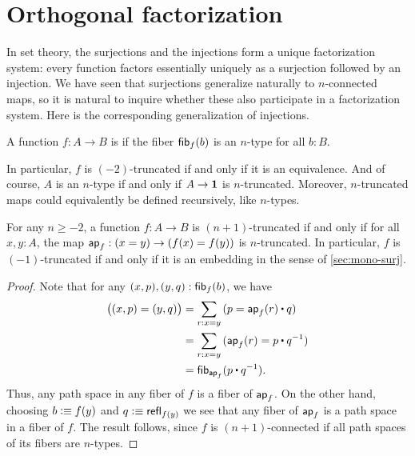 \section{Orthogonal factorization}
\label{sec:image-factorization}

In set theory, the surjections and the injections form a unique factorization system: every function factors essentially uniquely as a surjection followed by an injection.
We have seen that surjections generalize naturally to $n$-connected maps, so it is natural to inquire whether these also participate in a factorization system.
Here is the corresponding generalization of injections.

\begin{defn}
  A function $f:A\to B$ is 
if the fiber ${\mathsf{fib}}_{f}(b)$ is an $n$-type for all $b:B$.
\end{defn}

In particular, $f$ is $(-2)$-truncated if and only if it is an equivalence.
And of course, $A$ is an $n$-type if and only if $A\to\mathbf{1}$ is $n$-truncated.
Moreover, $n$-truncated maps could equivalently be defined recursively, like $n$-types.

\begin{lem}\label{thm:modal-mono}
  For any $n\ge -2$, a function $f:A\to B$ is $(n+1)$-truncated if and only if for all $x,y:A$, the map $\mathsf{ap}_{f}:(x=y) \to (f(x)=f(y))$ is $n$-truncated.
  In particular, $f$ is $(-1)$-truncated if and only if it is an embedding in the sense of \autoref{sec:mono-surj}.
\end{lem}
\begin{proof}
  Note that for any $(x,p),(y,q):{\mathsf{fib}}_{f}(b)$, we have
  \begin{align*}
    \big((x,p) = (y,q)\big)
    &= \sm{r:x=y} (p = \apfunc f(r)\ct q)\\
    &= \sm{r:x=y} (\apfunc f (r) = p\ct \opp q)\\
    &= \hfib{\apfunc{f}}{p\ct \opp q}.
  \end{align*}
  Thus, any path space in any fiber of $f$ is a fiber of $\mathsf{ap}_{f}$.
  On the other hand, choosing $b\vcentcolon\equiv f(y)$ and $q\vcentcolon\equiv \mathsf{refl}_{f(y)}$ we see that any fiber of $\mathsf{ap}_{f}$ is a path space in a fiber of $f$.
  The result follows, since $f$ is $(n+1)$-connected if all path spaces of its fibers are $n$-types.
\end{proof}


